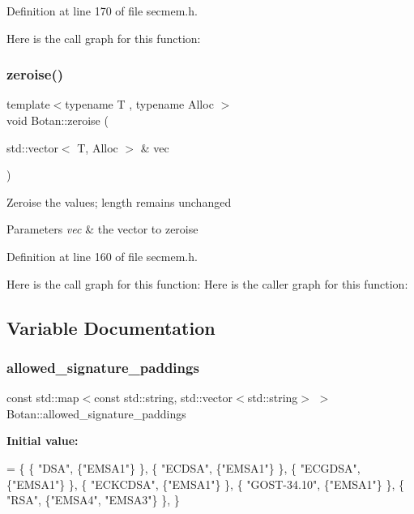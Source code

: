 Definition at line 170 of file secmem.\+h.

Here is the call graph for this function\+:
\mbox{\label{namespace_botan_a09ce987463cc4e1b7682f31bb486fdb1}} 
\subsubsection{\texorpdfstring{zeroise()}{zeroise()}}
{\footnotesize\ttfamily template$<$typename T , typename Alloc $>$ \\
void Botan\+::zeroise (\begin{DoxyParamCaption}\item[{std\+::vector$<$ T, Alloc $>$ \&}]{vec }\end{DoxyParamCaption})}

Zeroise the values; length remains unchanged 
\begin{DoxyParams}{Parameters}
{\em vec} & the vector to zeroise \\
\hline
\end{DoxyParams}


Definition at line 160 of file secmem.\+h.

Here is the call graph for this function\+:
Here is the caller graph for this function\+:


\subsection{Variable Documentation}
\mbox{\label{namespace_botan_afbb6ea5fa1423573816f3aeb42fb5062}} 
\subsubsection{\texorpdfstring{allowed\+\_\+signature\+\_\+paddings}{allowed\_signature\_paddings}}
{\footnotesize\ttfamily const std\+::map$<$const std\+::string, std\+::vector$<$std\+::string$>$ $>$ Botan\+::allowed\+\_\+signature\+\_\+paddings}

{\bfseries Initial value\+:}
\begin{DoxyCode}
=
   \{
   \{ \textcolor{stringliteral}{"DSA"}, \{\textcolor{stringliteral}{"EMSA1"}\} \},
   \{ \textcolor{stringliteral}{"ECDSA"}, \{\textcolor{stringliteral}{"EMSA1"}\} \},
   \{ \textcolor{stringliteral}{"ECGDSA"}, \{\textcolor{stringliteral}{"EMSA1"}\} \},
   \{ \textcolor{stringliteral}{"ECKCDSA"}, \{\textcolor{stringliteral}{"EMSA1"}\} \},
   \{ \textcolor{stringliteral}{"GOST-34.10"}, \{\textcolor{stringliteral}{"EMSA1"}\} \},
   \{ \textcolor{stringliteral}{"RSA"}, \{\textcolor{stringliteral}{"EMSA4"}, \textcolor{stringliteral}{"EMSA3"}\} \},
   \}
\end{DoxyCode}


